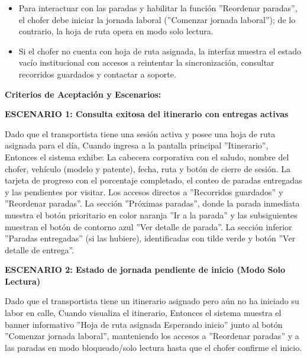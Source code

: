 \documentclass[a4paper,9pt]{article}
\begin{document}
\begin{tcolorbox}[hucard, title={\textbf{HU-62: CONSULTAR ITINERARIO} \hfill \scriptsize \colorbox{tealstatus}{\textbf{\ Accepted\ }} \quad \colorbox{white}{\textcolor{primarydark}{\textbf{\ 2 pts\ }}}}]
{\begin{itemize}[leftmargin=12pt, nosep, itemsep=1.5pt, topsep=1pt]
\item Para interactuar con las paradas y habilitar la función ''Reordenar paradas'', el chofer debe iniciar la jornada laboral (''Comenzar jornada laboral''); de lo contrario, la hoja de ruta opera en modo solo lectura.
\item Si el chofer no cuenta con hoja de ruta asignada, la interfaz muestra el estado vacío institucional con accesos a reintentar la sincronización, consultar recorridos guardados y contactar a soporte.
\end{itemize}
}\par\vspace{3pt}
\noindent\textbf{\footnotesize Criterios de Aceptación y Escenarios:}\par\vspace{2pt}
{\footnotesize
\noindent\textbf{\textcolor{secondarydark}{ESCENARIO 1:  Consulta exitosa del itinerario con entregas activas}}\par\vspace{1pt}
Dado que el transportista tiene una sesión activa y posee una hoja de ruta asignada para el día, Cuando ingresa a la pantalla principal ''Itinerario'', Entonces el sistema exhibe: La cabecera corporativa con el saludo, nombre del chofer, vehículo (modelo y patente), fecha, ruta y botón de cierre de sesión. La tarjeta de progreso con el porcentaje completado, el conteo de paradas entregadas y las pendientes por visitar. Los accesos directos a ''Recorridos guardados'' y ''Reordenar paradas''. La sección ''Próximas paradas'', donde la parada inmediata muestra el botón prioritario en color naranja ''Ir a la parada'' y las subsiguientes muestran el botón de contorno azul ''Ver detalle de parada''. La sección inferior ''Paradas entregadas'' (si las hubiere), identificadas con tilde verde y botón ''Ver detalle de entrega''.\par\vspace{2.5pt}
\noindent\textbf{\textcolor{secondarydark}{ESCENARIO 2:  Estado de jornada pendiente de inicio (Modo Solo Lectura)}}\par\vspace{1pt}
Dado que el transportista tiene un itinerario asignado pero aún no ha iniciado su labor en calle, Cuando visualiza el itinerario, Entonces el sistema muestra el banner informativo ''Hoja de ruta asignada   Esperando inicio'' junto al botón ''Comenzar jornada laboral'', manteniendo los accesos a ''Reordenar paradas'' y a las paradas en modo bloqueado/solo lectura hasta que el chofer confirme el inicio.\par\vspace{2.5pt}
}
\end{tcolorbox}
\end{document}

